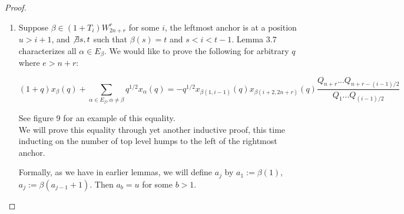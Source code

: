 \documentclass{amsart}
\begin{document}
\begin{proof}
\begin{enumerate}
	Note that in both corollary 3.2 and our inductive hypothesis (ii) we specified cases involving anchors. This allows the exact same logic from the proof of the first case to prove this case.
	
	\vspace{5mm}
	\item Suppose $\beta\in (1+T_i)W_{2n+r}^r$ for some $i$, the leftmost anchor is at a position $u>i+1$, and $\not\exists s,t$ such that $\beta(s)=t$ and $s<i<t-1$. Lemma $3.7$ characterizes all $\alpha\in E_\beta$. We would like to prove the following for arbitrary $q$ where $e>n+r$:
	
	$$(1+q)x_\beta(q)+\sum_{\alpha\in E_\beta,\alpha\not=\beta}q^{1/2}x_\alpha(q)=-q^{1/2}x_{\beta(1,i-1)}(q)x_{\beta(i+2,2n+r)}(q)\frac{Q_{n+r}...Q_{n+r-(i-1)/2}}{Q_1...Q_{(i-1)/2}}$$
	
	See figure 9 for an example of this equality.
	\\
	
	We will prove this equality through yet another inductive proof, this time inducting on the number of top level humps to the left of the rightmost anchor.
	
	Formally, as we have in earlier lemmas, we will define $a_j$ by $a_1:=\beta(1)$, $a_j:=\beta(a_{j-1}+1)$. Then $a_b=u$ for some $b>1$. 
	
	
	\end{enumerate}
\end{proof}
\end{document}
